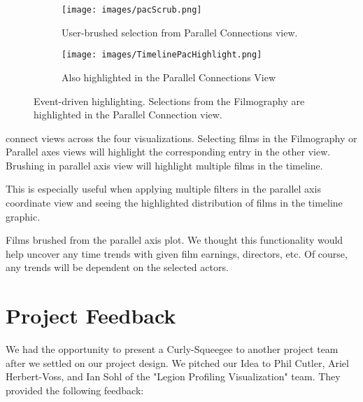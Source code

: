 \documentclass[12pt]{article}
\begin{document}
	\begin{figure}[h!]
		\centering
		\begin{subfigure}[t]{.5\textwidth}
		  \centering
		  \texttt{[image: images/pacScrub.png]}
		  \caption{User-brushed selection from Parallel Connections view.}
		  \label{fig:sub1}
		\end{subfigure}%
		\begin{subfigure}[t]{.8\textwidth}
		  \centering
		  \texttt{[image: images/TimelinePacHighlight.png]}
		  \caption{Also highlighted in the Parallel Connections View}
		  \label{fig:sub2}
		\end{subfigure}%
		\caption{Event-driven highlighting.  Selections from the Filmography are highlighted in the Parallel Connection view.}
		\label{fig:parallel ToFilmHighlight}
	\end{figure}


 connect views across the four visualizations.  Selecting films in the Filmography or Parallel axes views will highlight the corresponding entry in the other view.  Brushing in parallel axis view will highlight multiple films in the timeline.

This is especially useful when applying multiple filters in the parallel axis coordinate view and seeing the highlighted distribution of films in the timeline graphic.

Films brushed from the parallel axis plot.  We thought this functionality would help uncover any time trends with given film earnings, directors, etc.  Of course, any trends will be dependent on the selected actors.

\newpage

\section{Project Feedback} \label{sec:Projcet Feedback}

We had the opportunity to present a Curly-Squeegee to another project team after we settled on our project design.   We pitched our Idea to Phil Cutler, Ariel Herbert-Voss, and Ian Sohl of the "Legion Profiling Visualization" team. They provided the following feedback:
\end{document}
